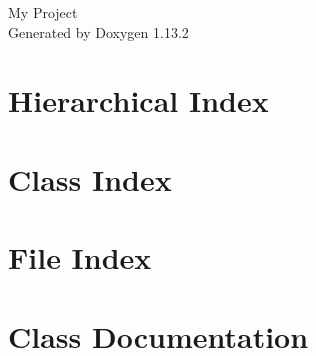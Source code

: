 \documentclass[twoside]{book}
\newcommand{\+}{\discretionary{\mbox{\scriptsize$\hookleftarrow$}}{}{}}
\newcommand{\clearemptydoublepage}{%
    \newpage{\pagestyle{empty}\cleardoublepage}%
  }
\begin{document}
  \raggedbottom
    \hypersetup{pageanchor=false,
                bookmarksnumbered=true,
                pdfencoding=unicode
               }
  \begin{titlepage}
  \vspace*{7cm}
  \begin{center}%
  {\Large My Project}\\
  \vspace*{1cm}
  {\large Generated by Doxygen 1.13.2}\\
  \end{center}
  \end{titlepage}
  \clearemptydoublepage
  \tableofcontents
  \clearemptydoublepage
  \hypersetup{pageanchor=true}
\chapter{Hierarchical Index}

\chapter{Class Index}

\chapter{File Index}

\chapter{Class Documentation}
























\end{document}
